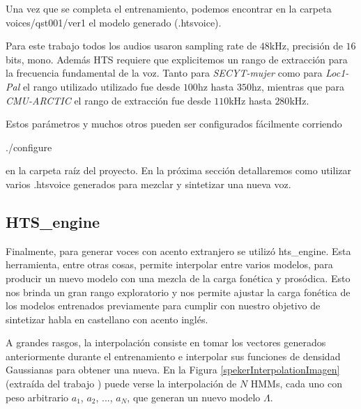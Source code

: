 Una vez que se completa el entrenamiento, podemos encontrar en la carpeta voices/qst001/ver1 el modelo generado (.htsvoice).

Para este trabajo todos los audios usaron sampling rate de $48$kHz, precisión de $16$bits, mono. Además HTS requiere que explicitemos un rango de extracción para la frecuencia fundamental de la voz. Tanto para \textit{SECYT-mujer} como para \textit{Loc1-Pal} el rango utilizado utilizado fue desde $100$hz hasta $350$hz, mientras que para \textit{CMU-ARCTIC} el rango de extracción fue desde $110$kHz hasta $280$kHz.

Estos parámetros y muchos otros pueden ser configurados fácilmente corriendo

\begin{tcolorbox}
./configure
\end{tcolorbox}

\noindent en la carpeta raíz del proyecto. En la próxima sección detallaremos como utilizar varios .htsvoice generados para mezclar y sintetizar una nueva voz.

\subsection{HTS\_engine} \label{interpolationTeory}

Finalmente, para generar voces con acento extranjero se utilizó hts\_engine. Esta herramienta, entre otras cosas, permite interpolar entre varios modelos, para producir un nuevo modelo con una mezcla de la carga fonética y prosódica. Esto nos brinda un gran rango exploratorio y nos permite ajustar la carga fonética de los modelos entrenados previamente para cumplir con nuestro objetivo de sintetizar habla en castellano con acento inglés.

A grandes rasgos, la interpolación consiste en tomar los vectores generados anteriormente durante el entrenamiento e interpolar sus funciones de densidad Gaussianas para obtener una nueva. En la Figura \ref{spekerInterpolationImagen} (extraída del trabajo \cite{SpekerInterpolationRef}) puede verse la interpolación de $N$ HMMs, cada uno con peso arbitrario $a_1$, $a_2$, ..., $a_N$, que generan un nuevo modelo $\Lambda$.

